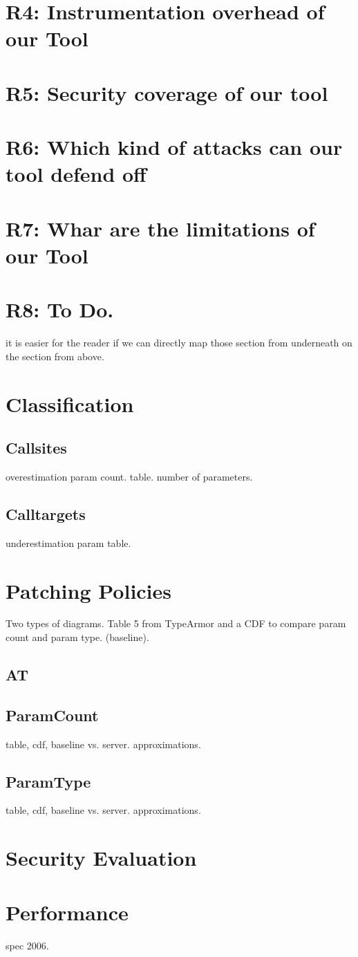 \section{R4: Instrumentation overhead of our Tool}

\section{R5: Security coverage of our tool}

\section{R6: Which kind of attacks can our tool defend off}

\section{R7: Whar are the limitations of our Tool}

\section{R8: To Do.}


it is easier for the reader if we can directly map those section from underneath on the section from above.

\section{Classification}
\subsection{Callsites}
overestimation param count. table.
number of parameters.

\subsection{Calltargets}
underestimation param table.

\section{Patching Policies}
Two types of diagrams. Table 5 from TypeArmor and a CDF to compare param count and param type. (baseline).
\subsection{AT}
\subsection{ParamCount}
table, cdf, baseline vs. server. approximations.

\subsection{ParamType}
table, cdf, baseline vs. server. approximations.

\section{Security Evaluation}

\section{Performance}
spec 2006.